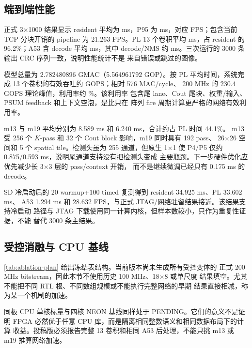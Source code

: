 \subsection{端到端性能}



正式 3$\times$1000 结果显示 resident 平均为 \ResidentMeanMs{} ms，P95 为
\ResidentPNinetyFiveMs{} ms，对应 \ResidentFPS{} FPS；包含当前 TCP 分块开销的
pipeline 为 21.263 FPS。PL 13 个卷积平均 \PLMeanMs{} ms，占 resident 的
96.2\%；A53 含 decode 平均 \AFTMeanMs{} ms，其中 decode/NMS 约
\DecodeMeanMs{} ms。三次运行的 3000 条输出 CRC 序列一致，说明性能统计不是
来自错误或跳过的图像。



模型总量为 2.782480896 GMAC（5.564961792 GOP）。按 PL 平均时间，系统完成
13 个卷积的有效吞吐约 \PLEffectiveGOPS{} GOPS；相对 576 MAC/cycle、
200 MHz 的 230.4 GOPS 理论峰值，利用率约 \ArrayUtilization{}\%。该利用率
包含尾 lane、Cout 尾块、权重/输入、PSUM feedback 和上下文空泡，是比只在
阵列 fire 周期计算更严格的网络有效利用率。



m13 与 m19 平均分别为 8.589 ms 和 6.240 ms，合计约占 PL 时间 44.1\%。
m13 受 256 个 $K$-pass 和 32 个 Cout block 影响，m19 同时具有 192 pass、
26$\times$26 空间和 5 个 spatial tile。检测头虽为 255 通道，但原生
1$\times$1 使 P4/P5 仅约 0.875/0.593 ms，说明尾通道支持没有把检测头变成
主要瓶颈。下一步硬件优化应优先减少长 3$\times$3 层的 pass/context 开销，
而不是继续微调已经只有 0.175 ms 的 decode。

SD 冷启动后的 20 warmup+100 timed 复测得到 resident 34.925 ms、PL 33.602 ms、
A53 1.294 ms 和 28.632 FPS，与正式 JTAG/网络驻留结果接近。该结果支持冷启动
路径与 JTAG 下载使用同一计算内核，但样本数较小，只作为重复性证据，不能
替代 3000 条主结果。

\subsection{受控消融与 CPU 基线}

\cref{tab:ablation-plan} 给出冻结表结构。当前版本尚未生成所有受控变体的
正式 200 MHz bitstream，因此本节不使用历史 100 MHz、18$\times$8 或单尺度
结果填空。尤其不能把不同 RTL 根、不同数组规模或不能执行完整网络的早期
结果直接相减，称为某一个机制的加速。



同板 CPU 单核标量与四核 NEON 基线同样处于 PENDING。它们的意义不是证明
FPGA 必然优于任意 CPU 库，而是隔离相同整数语义和相同数据布局下的计算
收益。投稿版必须报告完整 13 卷积和相同 A53 后处理，不能只挑 m13 或 m19
推算网络加速。

